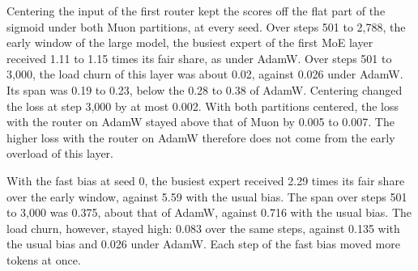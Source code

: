 Centering the input of the first router kept the scores off the flat part of the sigmoid under both Muon partitions, at every seed. Over steps 501 to 2,788, the early window of the large model, the busiest expert of the first MoE layer received 1.11 to 1.15 times its fair share, as under AdamW\@. Over steps 501 to 3,000, the load churn of this layer was about 0.02, against 0.026 under AdamW\@. Its span was 0.19 to 0.23, below the 0.28 to 0.38 of AdamW\@. Centering changed the loss at step 3,000 by at most 0.002. With both partitions centered, the loss with the router on AdamW stayed above that of Muon by 0.005 to 0.007. The higher loss with the router on AdamW therefore does not come from the early overload of this layer.

With the fast bias at seed 0, the busiest expert received 2.29 times its fair share over the early window, against 5.59 with the usual bias. The span over steps 501 to 3,000 was 0.375, about that of AdamW, against 0.716 with the usual bias. The load churn, however, stayed high: 0.083 over the same steps, against 0.135 with the usual bias and 0.026 under AdamW\@. Each step of the fast bias moved more tokens at once.
